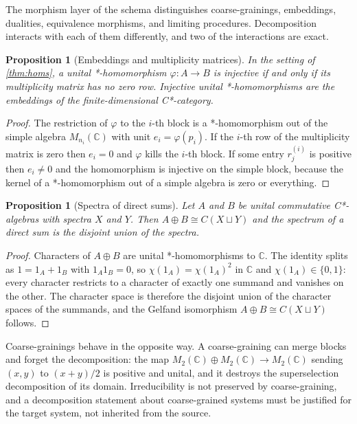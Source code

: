 \documentclass[11pt,letterpaper]{article}
\newtheorem{proposition}[theorem]{Proposition}
\theoremstyle{definition}
\theoremstyle{remark}
\begin{document}
The morphism layer of the schema distinguishes coarse-grainings, embeddings, dualities, equivalence morphisms, and limiting procedures. Decomposition interacts with each of them differently, and two of the interactions are exact.

\begin{proposition}[Embeddings and multiplicity matrices]
\label{prop:embeddings}
In the setting of \cref{thm:homs}, a unital *-homomorphism $\varphi \colon A \to B$ is injective if and only if its multiplicity matrix has no zero row. Injective unital *-homomorphisms are the embeddings of the finite-dimensional C*-category.
\end{proposition}

\begin{proof}
The restriction of $\varphi$ to the $i$-th block is a *-homomorphism out of the simple algebra $M_{n_i}(\mathbb{C})$ with unit $e_i = \varphi(p_i)$. If the $i$-th row of the multiplicity matrix is zero then $e_i = 0$ and $\varphi$ kills the $i$-th block. If some entry $r^{(i)}_j$ is positive then $e_i \neq 0$ and the homomorphism is injective on the simple block, because the kernel of a *-homomorphism out of a simple algebra is zero or everything.
\end{proof}

\begin{proposition}[Spectra of direct sums]
\label{prop:spectrum-sum}
Let $A$ and $B$ be unital commutative C*-algebras with spectra $X$ and $Y$. Then $A \oplus B \cong C(X \sqcup Y)$ and the spectrum of a direct sum is the disjoint union of the spectra.
\end{proposition}

\begin{proof}
Characters of $A \oplus B$ are unital *-homomorphisms to $\mathbb{C}$. The identity splits as $1 = 1_A + 1_B$ with $1_A 1_B = 0$, so $\chi(1_A) = \chi(1_A)^2$ in $\mathbb{C}$ and $\chi(1_A) \in \{0, 1\}$: every character restricts to a character of exactly one summand and vanishes on the other. The character space is therefore the disjoint union of the character spaces of the summands, and the Gelfand isomorphism $A \oplus B \cong C(X \sqcup Y)$ follows.
\end{proof}

Coarse-grainings behave in the opposite way. A coarse-graining can merge blocks and forget the decomposition: the map $M_2(\mathbb{C}) \oplus M_2(\mathbb{C}) \to M_2(\mathbb{C})$ sending $(x,y)$ to $(x+y)/2$ is positive and unital, and it destroys the superselection decomposition of its domain. Irreducibility is not preserved by coarse-graining, and a decomposition statement about coarse-grained systems must be justified for the target system, not inherited from the source.
\end{document}
